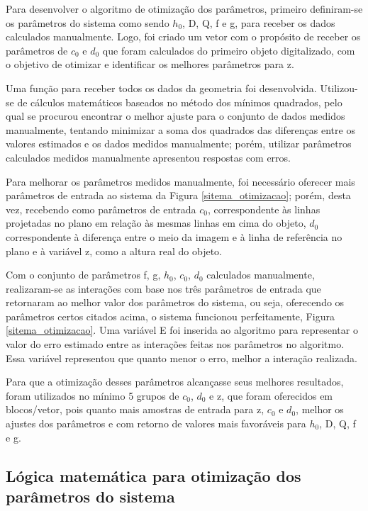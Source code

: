 \documentclass[a4paper, 12pt]{article}
\begin{document}
Para desenvolver o algoritmo de otimização dos parâmetros, primeiro definiram-se os parâmetros do sistema como sendo $h_0$, D, Q, f e g, para receber os dados calculados manualmente. Logo, foi criado um vetor com o propósito de receber os parâmetros de $c_0$ e $d_0$ que foram calculados do primeiro objeto digitalizado, com o objetivo de otimizar e identificar os melhores parâmetros para z.

Uma função para receber todos os dados da geometria foi desenvolvida. Utilizou-se de cálculos matemáticos baseados no método dos mínimos quadrados, pelo qual se procurou encontrar o melhor ajuste para o conjunto de dados medidos manualmente, tentando minimizar a soma dos quadrados das diferenças entre os valores estimados e os dados medidos manualmente; porém, utilizar parâmetros calculados medidos manualmente apresentou respostas com erros.

Para melhorar os parâmetros medidos manualmente, foi necessário oferecer mais parâmetros de entrada ao sistema da Figura \ref{sitema_otimizacao}; porém, desta vez, recebendo como parâmetros de entrada $c_0$, correspondente às linhas projetadas no plano em relação às mesmas linhas em cima do objeto, $d_0$ correspondente à diferença entre o meio da imagem e à linha de referência no plano e à variável z, como a altura real do objeto.

Com o conjunto de parâmetros f, g, $h_0$, $c_0$, $d_0$ calculados manualmente, realizaram-se as interações com base nos três parâmetros de entrada que retornaram ao melhor valor dos parâmetros do sistema, ou seja, oferecendo os parâmetros certos citados acima, o sistema funcionou perfeitamente, Figura \ref{sitema_otimizacao}. Uma variável E foi inserida ao algoritmo para representar o valor do erro estimado entre as interações feitas nos parâmetros no algoritmo. Essa variável representou que quanto menor o erro, melhor a interação realizada.

Para que a otimização desses parâmetros alcançasse seus melhores resultados, foram utilizados no mínimo 5 grupos de $c_0$, $d_0$ e z, que foram oferecidos em blocos/vetor, pois quanto mais amostras de entrada para z, $c_0$ e $d_0$, melhor os ajustes dos parâmetros e com retorno de valores mais favoráveis para $h_0$, D, Q, f e g. 

\subsection{Lógica matemática para otimização dos parâmetros do sistema}
\end{document}
